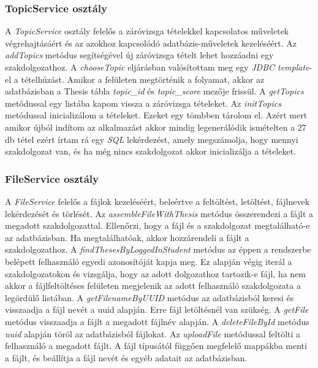 \subsubsection{TopicService osztály}

A \textit{TopicService} osztály felelős a záróvizsga tételekkel kapcsolatos műveletek végrehajtásáért és az azokhoz kapcsolódó adatbázis-műveletek kezeléséért. Az \textit{addTopics} metódus segítségével új záróvizsga tételt lehet hozzáadni egy szakdolgozathoz. A \textit{chooseTopic} eljárásban valósítottam meg egy \textit{JDBC template}-el \cite{JdbcTemplate} a tételhúzást. Amikor a felületen megtörténik a folyamat, akkor az adatbázisban a Thesis tábla \textit{topic\_id} és \textit{topic\_score} mezője frissül. A \textit{getTopics} metódussal egy listába kapom vissza a záróvizsga tételeket. Az \textit{initTopics} metódussal inicializálom a tételeket. Ezeket egy tömbben tárolom el. Azért mert amikor újból indítom az alkalmazást akkor mindig legenerálódik ismételten a 27 db tétel ezért írtam rá egy \textit{SQL} \cite{SQL} lekérdezést, amely megszámolja, hogy mennyi szakdolgozat van, és ha még nincs szakdolgozat akkor inicializálja a tételeket.

\subsubsection{FileService osztály}

A \textit{FileService} felelős a fájlok kezeléséért, beleértve a feltöltést, letöltést, fájlnevek lekérdezését és törlését. Az \textit{assembleFileWithThesis} metódus összerendezi a fájlt a megadott szakdolgozattal. Ellenőrzi, hogy a fájl és a szakdolgozat megtalálható-e az adatbázisban. Ha megtalálhatóak, akkor hozzárendeli a fájlt a szakdolgozathoz. A \textit{findThesesByLoggedInStudent} metódus az éppen a rendszerbe belépett felhasználó egyedi azonosítóját kapja meg. Ez alapján végig iterál a szakdolgozatokon és vizsgálja, hogy az adott dolgozathoz tartozik-e fájl, ha nem akkor a fájlfeltöltéses felületen megjelenik az adott felhasználó szakdolgozata a legördülő listában. A \textit{getFilenameByUUID} metódus az adatbázisból keresi és visszaadja a fájl nevét a uuid alapján. Erre fájl letöltésnél van szükség. A \textit{getFile} metódus visszaadja a fájlt a megadott fájlnév alapján. A \textit{deleteFileById} metódus \textit{uuid} alapján töröl az adatbázisból fájlokat. Az \textit{uploadFile} metódussal feltölti a felhasználó a megadott fájlt. A fájl típusától függően megfelelő mappákba menti a fájlt, és beállítja a fájl nevét és egyéb adatait az adatbázisban.

